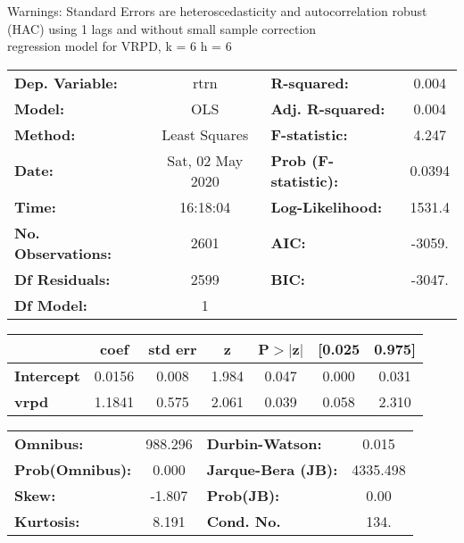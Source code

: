 Warnings: \newline
 [1] Standard Errors are heteroscedasticity and autocorrelation robust (HAC) using 1 lags and without small sample correction\\ 

regression model for VRPD, k = 6 h = 6\begin{center}
\begin{tabular}{lclc}
\toprule
\textbf{Dep. Variable:}    &       rtrn       & \textbf{  R-squared:         } &     0.004   \\
\textbf{Model:}            &       OLS        & \textbf{  Adj. R-squared:    } &     0.004   \\
\textbf{Method:}           &  Least Squares   & \textbf{  F-statistic:       } &     4.247   \\
\textbf{Date:}             & Sat, 02 May 2020 & \textbf{  Prob (F-statistic):} &   0.0394    \\
\textbf{Time:}             &     16:18:04     & \textbf{  Log-Likelihood:    } &    1531.4   \\
\textbf{No. Observations:} &        2601      & \textbf{  AIC:               } &    -3059.   \\
\textbf{Df Residuals:}     &        2599      & \textbf{  BIC:               } &    -3047.   \\
\textbf{Df Model:}         &           1      & \textbf{                     } &             \\
\bottomrule
\end{tabular}
\begin{tabular}{lcccccc}
                   & \textbf{coef} & \textbf{std err} & \textbf{z} & \textbf{P$> |$z$|$} & \textbf{[0.025} & \textbf{0.975]}  \\
\midrule
\textbf{Intercept} &       0.0156  &        0.008     &     1.984  &         0.047        &        0.000    &        0.031     \\
\textbf{vrpd}      &       1.1841  &        0.575     &     2.061  &         0.039        &        0.058    &        2.310     \\
\bottomrule
\end{tabular}
\begin{tabular}{lclc}
\textbf{Omnibus:}       & 988.296 & \textbf{  Durbin-Watson:     } &    0.015  \\
\textbf{Prob(Omnibus):} &   0.000 & \textbf{  Jarque-Bera (JB):  } & 4335.498  \\
\textbf{Skew:}          &  -1.807 & \textbf{  Prob(JB):          } &     0.00  \\
\textbf{Kurtosis:}      &   8.191 & \textbf{  Cond. No.          } &     134.  \\
\bottomrule
\end{tabular}
\end{center}

